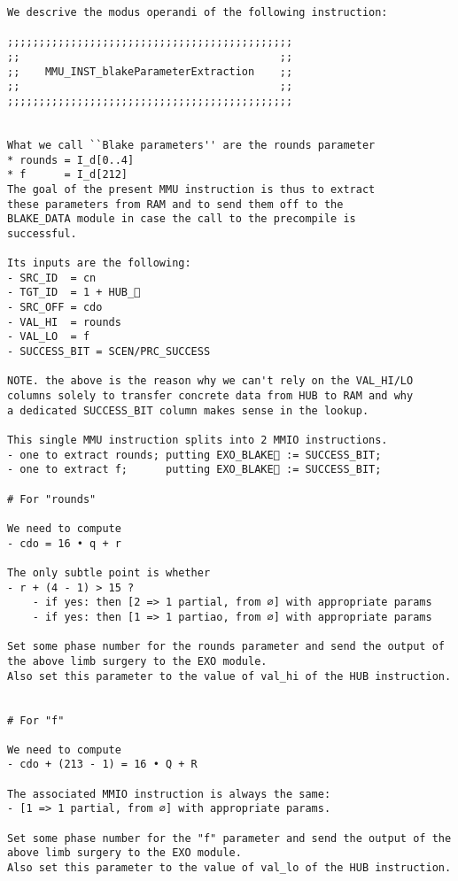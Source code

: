 \documentclass[varwidth=\maxdimen,margin=0.5cm,multi={verbatim}]{standalone}
\begin{document}
\begin{verbatim}
We descrive the modus operandi of the following instruction: 

;;;;;;;;;;;;;;;;;;;;;;;;;;;;;;;;;;;;;;;;;;;;;
;;                                         ;;
;;    MMU_INST_blakeParameterExtraction    ;;
;;                                         ;;
;;;;;;;;;;;;;;;;;;;;;;;;;;;;;;;;;;;;;;;;;;;;;


What we call ``Blake parameters'' are the rounds parameter
* rounds = I_d[0..4]
* f      = I_d[212]
The goal of the present MMU instruction is thus to extract
these parameters from RAM and to send them off to the
BLAKE_DATA module in case the call to the precompile is
successful.

Its inputs are the following:
- SRC_ID  = cn
- TGT_ID  = 1 + HUB_
- SRC_OFF = cdo
- VAL_HI  = rounds
- VAL_LO  = f
- SUCCESS_BIT = SCEN/PRC_SUCCESS 

NOTE. the above is the reason why we can't rely on the VAL_HI/LO
columns solely to transfer concrete data from HUB to RAM and why
a dedicated SUCCESS_BIT column makes sense in the lookup.

This single MMU instruction splits into 2 MMIO instructions.
- one to extract rounds; putting EXO_BLAKE🏴 := SUCCESS_BIT;
- one to extract f;      putting EXO_BLAKE🏴 := SUCCESS_BIT;

# For "rounds"

We need to compute
- cdo = 16 • q + r

The only subtle point is whether
- r + (4 - 1) > 15 ?
    - if yes: then [2 => 1 partial, from ∅] with appropriate params
    - if yes: then [1 => 1 partiao, from ∅] with appropriate params

Set some phase number for the rounds parameter and send the output of the above limb surgery to the EXO module.
Also set this parameter to the value of val_hi of the HUB instruction.


# For "f"

We need to compute
- cdo + (213 - 1) = 16 • Q + R

The associated MMIO instruction is always the same:
- [1 => 1 partial, from ∅] with appropriate params.

Set some phase number for the "f" parameter and send the output of the above limb surgery to the EXO module.
Also set this parameter to the value of val_lo of the HUB instruction.
\end{verbatim}
\end{document}
